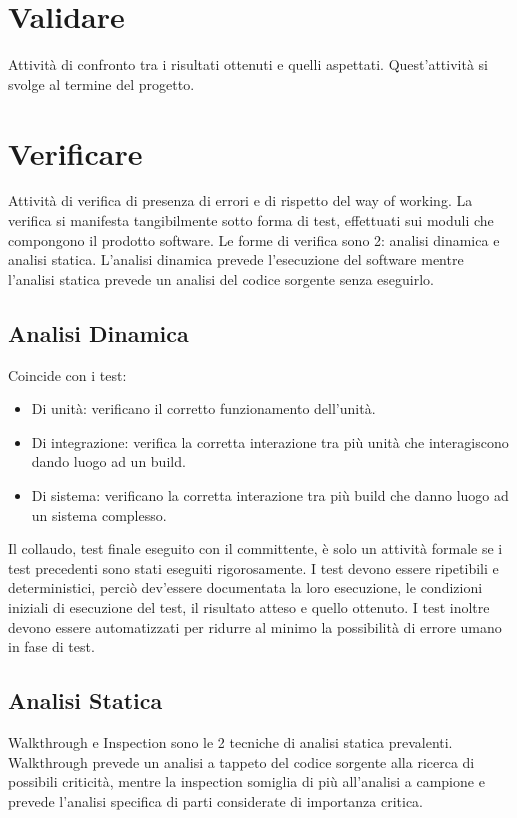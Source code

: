 \documentclass[11pt]{article}
\begin{document}
	\section{\LARGE Validare}
	\label{sec:validare}
	Attività di confronto tra i risultati ottenuti e quelli aspettati. Quest'attività si svolge al termine del progetto.
	
	\section{\LARGE Verificare}
	\label{sec:verificare}
	Attività di verifica di presenza di errori e di rispetto del way of working. La verifica si manifesta tangibilmente sotto forma di test, effettuati sui moduli che compongono il prodotto software. Le forme di verifica sono 2: analisi dinamica e analisi statica. L'analisi dinamica prevede l'esecuzione del software mentre l'analisi statica prevede un analisi del codice sorgente senza eseguirlo. 
	\subsection{Analisi Dinamica}
	Coincide con i test: 
	\begin{itemize}  
	\item Di unità: verificano il corretto funzionamento dell'unità.
	\item Di integrazione: verifica la corretta interazione tra più unità che interagiscono dando luogo ad un build.
	\item Di sistema: verificano la corretta interazione tra più build che danno luogo ad un sistema complesso.
	\end{itemize}	
	Il collaudo, test finale eseguito con il committente, è solo un attività formale se i test precedenti sono stati eseguiti rigorosamente. I test devono essere ripetibili e deterministici, perciò dev'essere documentata la loro esecuzione, le condizioni iniziali di esecuzione del test, il risultato atteso e quello ottenuto. I test inoltre devono essere automatizzati per ridurre al minimo la possibilità di errore umano in fase di test.
	\subsection{Analisi Statica}
	Walkthrough e Inspection sono le 2 tecniche di analisi statica prevalenti. Walkthrough prevede un analisi a tappeto del codice sorgente alla ricerca di possibili criticità, mentre la inspection somiglia di più all'analisi a campione e prevede l'analisi specifica di parti considerate di importanza critica.
	
\end{document}

